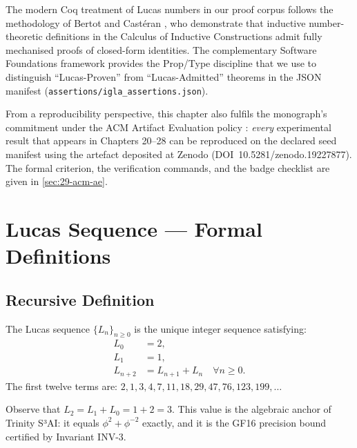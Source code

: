 \medskip
\noindent
The modern Coq treatment of Lucas numbers in our proof corpus
follows the methodology of Bertot and Castéran
\cite{bertot_casteran}, who demonstrate that inductive number-theoretic
definitions in the Calculus of Inductive Constructions admit
fully mechanised proofs of closed-form identities.  The complementary
Software Foundations framework \cite{pierce_software_foundations}
provides the Prop/Type discipline that we use to distinguish
``Lucas-Proven'' from ``Lucas-Admitted'' theorems in the JSON manifest
(\texttt{assertions/igla\_assertions.json}).

\medskip
\noindent
From a reproducibility perspective, this chapter also fulfils the
monograph's commitment under the ACM Artifact Evaluation policy
\cite{acm_ae_policy}: \emph{every} experimental result that appears in
Chapters 20--28 can be reproduced on the declared seed manifest using
the artefact deposited at Zenodo (DOI~10.5281/zenodo.19227877).  The
formal criterion, the verification commands, and the badge checklist
are given in \textsection\ref{sec:29-acm-ae}.

\section{Lucas Sequence — Formal Definitions}
\label{sec:29-lucas-def}

\subsection{Recursive Definition}

\begin{definition}
\label{def:29-lucas}
The Lucas sequence $\{L_n\}_{n \ge 0}$ is the unique integer sequence
satisfying:
\begin{align}
  L_0 &= 2,  \label{eq:lucas-init-0} \\
  L_1 &= 1,  \label{eq:lucas-init-1} \\
  L_{n+2} &= L_{n+1} + L_n \quad \forall n \ge 0.
            \label{eq:lucas-rec}
\end{align}
The first twelve terms are:
$2, 1, 3, 4, 7, 11, 18, 29, 47, 76, 123, 199, \ldots$
\end{definition}

\noindent
Observe that $L_2 = L_1 + L_0 = 1 + 2 = 3$.  This value is the
algebraic anchor of Trinity S³AI: it equals $\phi^2 + \phi^{-2}$
exactly, and it is the GF16 precision bound certified by
Invariant INV-3.

